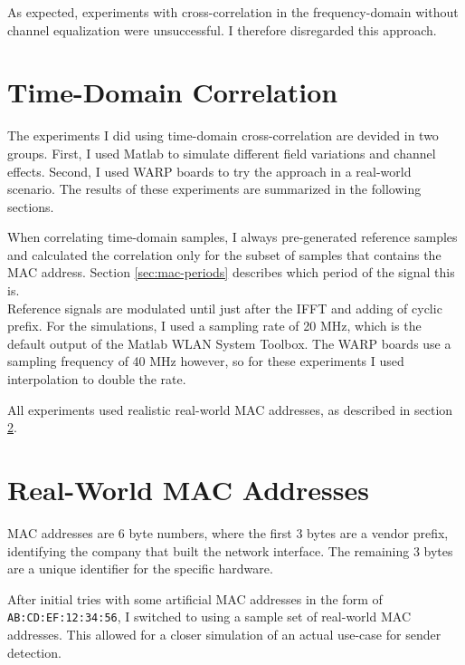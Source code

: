 As expected, experiments with cross-correlation in the frequency-domain without channel equalization were unsuccessful. I therefore disregarded this approach.



\section{Time-Domain Correlation}

The experiments I did using time-domain cross-correlation are devided in two groups. First, I used Matlab to simulate different field variations and channel effects. Second, I used WARP boards to try the approach in a real-world scenario. The results of these experiments are summarized in the following sections.

When correlating time-domain samples, I always pre-generated reference samples and calculated the correlation only for the subset of samples that contains the \gls{MAC} address. Section \ref{sec:mac-periods} describes which period of the signal this is.\\

Reference signals are modulated until just after the \gls{IFFT} and adding of cyclic prefix. For the simulations, I used a sampling rate of 20 MHz, which is the default output of the Matlab WLAN System Toolbox. The WARP boards use a sampling frequency of 40 MHz however, so for these experiments I used interpolation to double the rate.

All experiments used realistic real-world \gls{MAC} addresses, as described in section \ref{sec:real-world-macs}.



\section{Real-World MAC Addresses}\label{sec:real-world-macs}

\gls{MAC} addresses are 6 byte numbers, where the first 3 bytes are a vendor prefix, identifying the company that built the network interface. The remaining 3 bytes are a unique identifier for the specific hardware.

After initial tries with some artificial \gls{MAC} addresses in the form of \texttt{AB:CD:EF:12:34:56}, I switched to using a sample set of real-world \gls{MAC} addresses. This allowed for a closer simulation of an actual use-case for sender detection.\\

